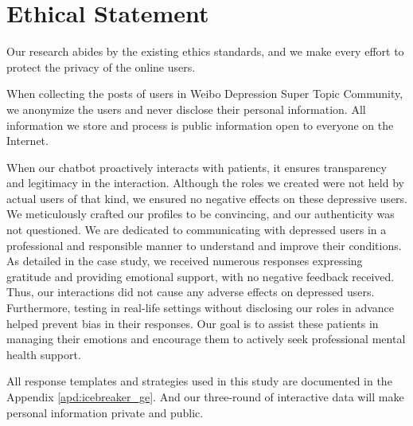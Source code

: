 \section*{Ethical Statement}
\label{sec:ethics}

Our research abides by the existing ethics standards, and we make every effort to 
protect the privacy of the online users.

When collecting the posts of users in Weibo Depression Super Topic Community, we anonymize the users and never disclose their personal information. All information we store and process is
public information open to everyone on the Internet. 

When our chatbot proactively interacts with patients, it ensures transparency and legitimacy in the interaction. Although the roles we created were not held by actual users of that kind, we ensured no negative effects on these depressive users. We meticulously crafted our profiles to be convincing, and our authenticity was not questioned.
We are dedicated to communicating with depressed users in a professional and responsible manner to understand and improve their conditions. As detailed in the case study, we received numerous responses expressing gratitude and providing emotional support, with no negative feedback received. Thus, our interactions did not cause any adverse effects on depressed users.
Furthermore, testing in real-life settings without disclosing our roles in advance helped prevent bias in their responses. Our goal is to assist these patients in managing their emotions and encourage them to actively seek professional mental health support. 

All response templates and strategies used in this study are documented in the Appendix \ref{apd:icebreaker_ge}.
And our three-round of interactive data will make personal information private and public.




